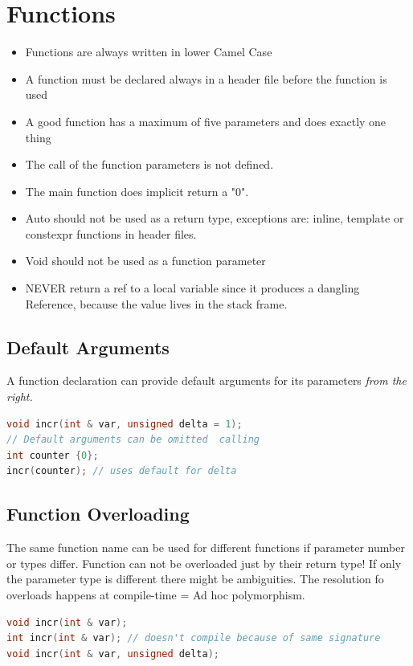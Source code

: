 
\section{Functions}
\begin{itemize}
  \itemsep -0.5em 
  \item Functions are always written in lower Camel Case
  \item A function must be declared always in a header file before the function is used
  \item A good function has a maximum of five parameters and does exactly one thing
  \item The call of the function parameters is not defined.
  \item The main function does implicit return a "0".
  \item Auto should not be used as a return type, exceptions are: inline, template or constexpr functions in header files.
  \item Void should not be used as a function parameter
  \item NEVER return a ref to a local variable since it produces a dangling Reference, because the value lives in the stack frame.
\end{itemize}

\subsection{Default Arguments}
A function declaration can provide default arguments for its parameters \textit{from the right.}
\begin{lstlisting}[language=C++]
void incr(int & var, unsigned delta = 1);
// Default arguments can be omitted  calling
int counter {0};
incr(counter); // uses default for delta
\end{lstlisting}

\subsection{Function Overloading}
The same function name can be used for different functions if parameter number or types differ. Function can not be overloaded just by their return type! If only the parameter type is different there might be ambiguities. The resolution fo overloads happens at compile-time = Ad hoc polymorphism.
\begin{lstlisting}[language=C++]
void incr(int & var);
int incr(int & var); // doesn't compile because of same signature
void incr(int & var, unsigned delta);
\end{lstlisting}

